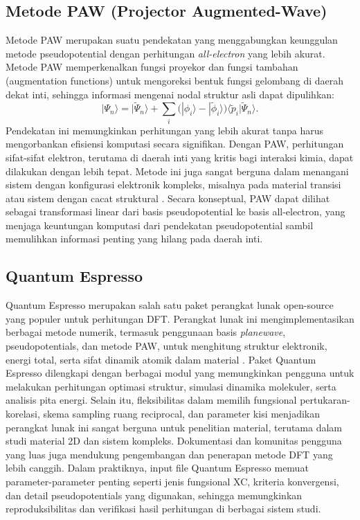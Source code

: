 \subsection{Metode PAW (Projector Augmented-Wave)}
Metode PAW merupakan suatu pendekatan yang menggabungkan keunggulan metode pseudopotential dengan perhitungan \emph{all-electron} yang lebih akurat.
Metode PAW memperkenalkan fungsi proyekor dan fungsi tambahan (augmentation functions) untuk mengoreksi bentuk fungsi gelombang di daerah dekat inti, sehingga informasi mengenai nodal struktur asli dapat dipulihkan:
\begin{equation}
|\Psi_n\rangle = |\tilde{\Psi}_n\rangle + \sum_i \Big(|\phi_i\rangle - |\tilde{\phi}_i\rangle\Big) \langle \tilde{p}_i |
\tilde{\Psi}_n \rangle.
\end{equation}
Pendekatan ini memungkinkan perhitungan yang lebih akurat tanpa harus mengorbankan efisiensi komputasi secara signifikan.
Dengan PAW, perhitungan sifat-sifat elektron, terutama di daerah inti yang kritis bagi interaksi kimia, dapat dilakukan dengan lebih tepat.
Metode ini juga sangat berguna dalam menangani sistem dengan konfigurasi elektronik kompleks, misalnya pada material transisi atau sistem dengan cacat struktural \citep{Blochl1994}.
Secara konseptual, PAW dapat dilihat sebagai transformasi linear dari basis pseudopotential ke basis all-electron, yang menjaga keuntungan komputasi dari pendekatan pseudopotential sambil memulihkan informasi penting yang hilang pada daerah inti.

\subsection{Quantum Espresso}
Quantum Espresso merupakan salah satu paket perangkat lunak open-source yang populer untuk perhitungan DFT.
Perangkat lunak ini mengimplementasikan berbagai metode numerik, termasuk penggunaan basis \emph{planewave}, pseudopotentials, dan metode PAW, untuk menghitung struktur elektronik, energi total, serta sifat dinamik atomik dalam material \citep{Giannozzi2009}.
Paket Quantum Espresso dilengkapi dengan berbagai modul yang memungkinkan pengguna untuk melakukan perhitungan optimasi struktur, simulasi dinamika molekuler, serta analisis pita energi.
Selain itu, fleksibilitas dalam memilih fungsional pertukaran-korelasi, skema sampling ruang reciprocal, dan parameter kisi menjadikan perangkat lunak ini sangat berguna untuk penelitian material, terutama dalam studi material 2D dan sistem kompleks.
Dokumentasi dan komunitas pengguna yang luas juga mendukung pengembangan dan penerapan metode DFT yang lebih canggih.
Dalam praktiknya, input file Quantum Espresso memuat parameter-parameter penting seperti jenis fungsional XC, kriteria konvergensi, dan detail pseudopotentials yang digunakan, sehingga memungkinkan reproduksibilitas dan verifikasi hasil perhitungan di berbagai sistem studi.

